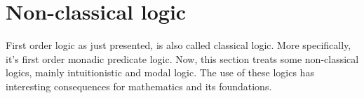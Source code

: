 \section{Non-classical logic}
First order logic as just presented, is also called classical logic. More specifically, it's first order monadic predicate logic.  Now, this section treats some non-classical logics, mainly intuitionistic and modal logic. The use of these logics has interesting consequences for mathematics and its foundations.
